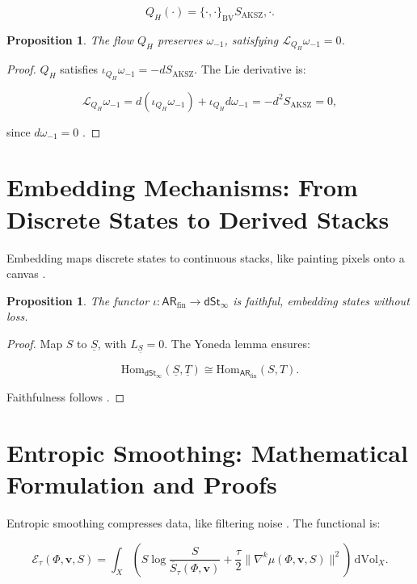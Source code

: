 \documentclass[a4paper,12pt]{article}
\newtheorem{proposition}[theorem]{Proposition}
\theoremstyle{definition}
\newcommand{\ARfin}{\mathsf{AR}_{\mathrm{fin}}}
\newcommand{\dSt}{\mathsf{dSt}_\infty}
\newcommand{\Etau}{\mathcal{E}_\tau}
\newcommand{\iotaf}{\iota}
\newcommand{\BV}{\{\cdot,\cdot\}_{\mathrm{BV}}}
\begin{document}
\[
Q_H(\cdot) = \BV{S_{\mathrm{AKSZ}}, \cdot}.
\]

\begin{proposition}
\label{prop:symplectic}
The flow \( Q_H \) preserves \(\omega_{-1}\), satisfying \(\mathcal{L}_{Q_H} \omega_{-1} = 0\).
\end{proposition}

\begin{proof}
\( Q_H \) satisfies \(\iota_{Q_H} \omega_{-1} = -d S_{\mathrm{AKSZ}}\). The Lie derivative is:

\[
\mathcal{L}_{Q_H} \omega_{-1} = d(\iota_{Q_H} \omega_{-1}) + \iota_{Q_H} d\omega_{-1} = -d^2 S_{\mathrm{AKSZ}} = 0,
\]

since \( d\omega_{-1} = 0 \) \cite{Arnold1989, Marsden1974, AKSZ1997}.
\end{proof}

\section{Embedding Mechanisms: From Discrete States to Derived Stacks}
\label{sec:embedding}

Embedding maps discrete states to continuous stacks, like painting pixels onto a canvas \cite{Lurie2009, Toen2014}.

\begin{proposition}
\label{prop:embedding}
The functor \(\iotaf: \ARfin \to \dSt\) is faithful, embedding states without loss.
\end{proposition}

\begin{proof}
Map \( S \) to \(\underline{S}\), with \( L_{\underline{S}} = 0 \). The Yoneda lemma ensures:

\[
\mathrm{Hom}_{\dSt}(\underline{S}, \underline{T}) \cong \mathrm{Hom}_{\ARfin}(S, T).
\]

Faithfulness follows \cite{Lurie2009, Eilenberg1945}.
\end{proof}

\section{Entropic Smoothing: Mathematical Formulation and Proofs}
\label{sec:entropic}

Entropic smoothing compresses data, like filtering noise \cite{Shannon1948, Shannon1951, Kolmogorov1965, Cover1991, Jaynes1957}. The functional is:

\[
\Etau(\Phi, \mathbf{v}, S) = \int_X \left( S \log \frac{S}{\bar{S}_\tau(\Phi, \mathbf{v})} + \frac{\tau}{2} \|\nabla^k \mu(\Phi, \mathbf{v}, S)\|^2 \right) \, \mathrm{dVol}_X.
\]
\end{document}
